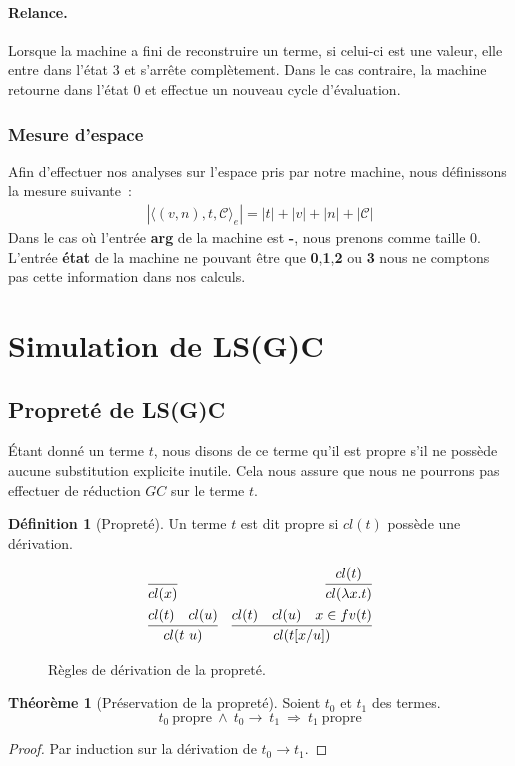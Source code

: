 \documentclass[a4paper, 11pt]{article}
\theoremstyle{definition}
\newtheorem{definition}{Définition}[section]
\newtheorem{theorem}{Théorème}[section]
\newcommand{\etat}[1]{\langle #1 \rangle}
\newcommand{\mcc}{\mathcal{C}}
\begin{document}
\paragraph{Relance.}
Lorsque la machine a fini de reconstruire un terme, si celui-ci est une valeur, elle entre dans l'état 3 et s'arrête complètement. 
Dans le cas contraire, la machine retourne dans l'état 0 et effectue un nouveau cycle d'évaluation.

\subsubsection{Mesure d'espace}
Afin d'effectuer nos analyses sur l'espace pris par notre machine, nous définissons la mesure suivante~:
\begin{align*}
    |\etat{(v,n), t, \mcc}_e| = |t| + |v| + |n| + |\mcc|
\end{align*}
Dans le cas où l'entrée \textbf{arg} de la machine est \textbf{-}, nous prenons comme taille $0$. 
L'entrée \textbf{état} de la machine ne pouvant être que \textbf{0},\textbf{1},\textbf{2} ou \textbf{3} nous ne comptons pas cette information dans nos calculs.
\section{Simulation de LS(G)C}
\label{sim:lsgc}
\subsection{Propreté de LS(G)C}
Étant donné un terme $t$, nous disons de ce terme qu'il est propre s'il ne possède aucune substitution explicite inutile.
Cela nous assure que nous ne pourrons pas effectuer de réduction $GC$ sur le terme $t$.
\begin{definition}[Propreté]
  Un terme $t$ est dit propre si $cl(t)$ possède une dérivation.
\begin{figure}[h!]
  \begin{align*} 
    &\infer{cl(x)}{}
 &\infer{cl(\lambda x.t)}{cl(t)}\\
 &\infer{cl(t~u)}{cl(t) & cl(u) }
&\infer{cl(t[x/u])}{cl(t)&cl(u)&x\in fv(t)}
  \end{align*}
  \caption{Règles de dérivation de la propreté.}\label{fig:clean}
\end{figure}
\end{definition}

\begin{theorem}[Préservation de la propreté]
  Soient $t_0$ et $t_1$ des termes. 
  \[
    t_0~\text{propre}~\wedge~t_0\rightarrow~t_1~\Rightarrow~t_1~\text{propre}
  \]
\end{theorem}
\begin{proof}
  Par induction sur la dérivation de $t_0 \rightarrow t_1$.
\end{proof}
\end{document}
